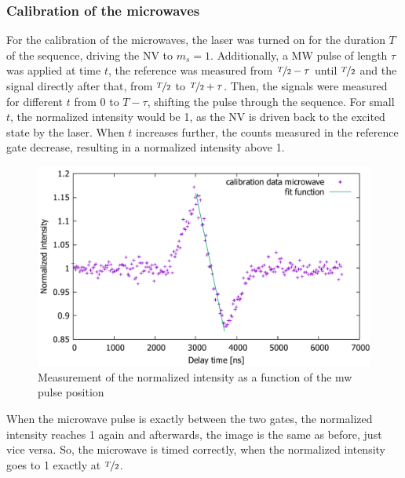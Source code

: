 \documentclass[12pt,a4paper]{article}
\begin{document}
\subsubsection{Calibration of the microwaves}
For the calibration of the microwaves, the laser was turned on for the duration $T$ of the sequence, driving the NV to $m_s=1$. Additionally, a MW pulse of length $\tau$ was applied at time $t$, the reference was measured from $\nicefrac{T}{2}-\tau$ until $\nicefrac{T}{2}$ and the signal directly after that, from $\nicefrac{T}{2}$ to $\nicefrac{T}{2}+\tau$. Then, the signals were measured for different $t$ from 0 to $T-\tau$, shifting the pulse through the sequence. For small $t$, the normalized intensity would be 1, as the NV is driven back to the excited state by the laser. When $t$ increases further, the counts measured in the reference gate decrease, resulting in a normalized intensity above 1. 
\begin{figure}[h!]
\centering
\includegraphics[scale=0.5]{mwt.pdf} 
\caption{Measurement of the normalized intensity as a function of the mw pulse position}
\label{mwt}
\end{figure}
\newpage
When the microwave pulse is exactly between the two gates, the normalized intensity reaches 1 again and afterwards, the image is the same as before, just vice versa. So, the microwave is timed correctly, when the normalized intensity goes to 1 exactly at $\nicefrac{T}{2}$.
\end{document}
